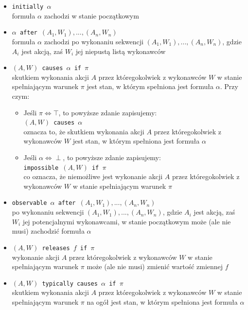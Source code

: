\documentclass{article}
\begin{document}
\begin{itemize}
\item {\large\texttt{initially $\alpha$}}\\
formuła $\alpha$ zachodzi w stanie początkowym
\item {\large\texttt{$\alpha$ after $(A_{1},W_{1}), ..., (A_{n},W_{n})$}}\\
formuła $\alpha$ zachodzi po wykonaniu sekwencji $(A_{1},W_{1}), ..., (A_{n},W_{n})$, gdzie $A_{i}$ jest akcją, zaś $W_{i}$ jej niepustą listą wykonawców
\item {\large\texttt{$(A,W)$ causes $\alpha$ if $\pi$}}\\
skutkiem wykonania akcji $A$ przez któregokolwiek z wykonawców $W$ w stanie spełniającym warunek $\pi$ jest stan, w którym spełniona jest formuła $\alpha$. Przy czym:
\begin{itemize}
    \item Jeśli $\pi \Leftrightarrow \top$, to powyższe zdanie zapisujemy:\\
    {\large\texttt{$(A,W)$ causes $\alpha$ }}\\
    oznacza to, że skutkiem wykonania akcji $A$ przez któregokolwiek z wykonawców $W$ jest stan, w którym spełniona jest formuła $\alpha$
    \item Jeśli $\alpha \Leftrightarrow \perp$, to powyższe zdanie zapisujemy:\\
    {\large\texttt{impossible $(A,W)$ if $\pi$}}\\
    co oznacza, że niemożliwe jest wykonanie akcji $A$ przez któregokolwiek z wykonawców $W$ w stanie spełniającym warunek $\pi$
\end{itemize}
\item {\large\texttt{observable $\alpha$ after $(A_{1},W_{1}), ..., (A_{n},W_{n})$}}\\
po wykonaniu sekwencji $(A_{1},W_{1}), ..., (A_{n},W_{n})$, gdzie $A_{i}$ jest akcją, zaś $W_{i}$ jej potencjalnymi wykonawcami, w stanie początkowym może (ale nie musi) zachodzić formuła $\alpha$
\item {\large\texttt{$(A,W)$ releases $f$ if $\pi$}}\\
wykonanie akcji $A$ przez któregokolwiek z wykonawców $W$ w stanie spełniającym warunek $\pi$ może (ale nie musi) zmienić wartość zmiennej $f$
\item {\large\texttt{$(A,W)$ typically causes $\alpha$ if $\pi$}}\\
skutkiem wykonania akcji $A$ przez któregokolwiek z wykonawców $W$ w stanie spełniającym warunek $\pi$ na ogół jest stan, w którym spełniona jest formuła $\alpha$

\end{itemize}
\end{document}
